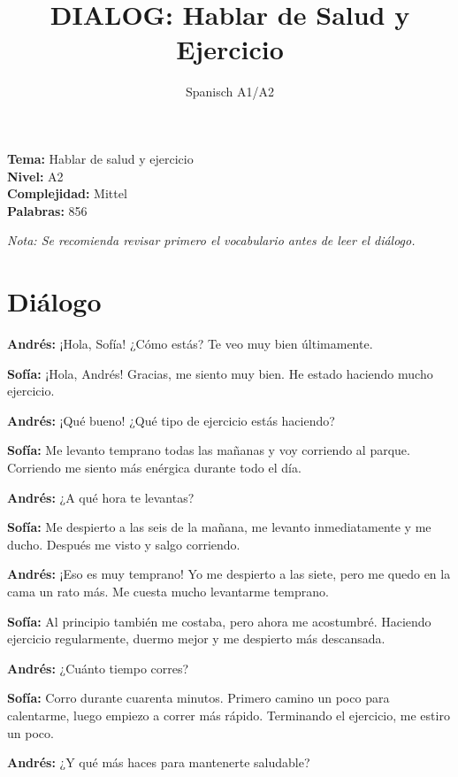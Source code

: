 \documentclass[12pt,a4paper]{article}
\begin{document}
\title{\textbf{DIALOG: Hablar de Salud y Ejercicio}}
\author{Spanisch A1/A2}
\date{}
\maketitle

\textbf{Tema:} Hablar de salud y ejercicio \\
\textbf{Nivel:} A2 \\
\textbf{Complejidad:} Mittel \\
\textbf{Palabras:} 856

\vspace{1em}

\textit{Nota: Se recomienda revisar primero el vocabulario antes de leer el diálogo.}

\vspace{1em}

\section*{Diálogo}

\textbf{Andrés:} ¡Hola, Sofía! ¿Cómo estás? Te veo muy bien últimamente.

\textbf{Sofía:} ¡Hola, Andrés! Gracias, me siento muy bien. He estado haciendo mucho ejercicio.

\textbf{Andrés:} ¡Qué bueno! ¿Qué tipo de ejercicio estás haciendo?

\textbf{Sofía:} Me levanto temprano todas las mañanas y voy corriendo al parque. Corriendo me siento más enérgica durante todo el día.

\textbf{Andrés:} ¿A qué hora te levantas?

\textbf{Sofía:} Me despierto a las seis de la mañana, me levanto inmediatamente y me ducho. Después me visto y salgo corriendo.

\textbf{Andrés:} ¡Eso es muy temprano! Yo me despierto a las siete, pero me quedo en la cama un rato más. Me cuesta mucho levantarme temprano.

\textbf{Sofía:} Al principio también me costaba, pero ahora me acostumbré. Haciendo ejercicio regularmente, duermo mejor y me despierto más descansada.

\textbf{Andrés:} ¿Cuánto tiempo corres?

\textbf{Sofía:} Corro durante cuarenta minutos. Primero camino un poco para calentarme, luego empiezo a correr más rápido. Terminando el ejercicio, me estiro un poco.

\textbf{Andrés:} ¿Y qué más haces para mantenerte saludable?
\end{document}
